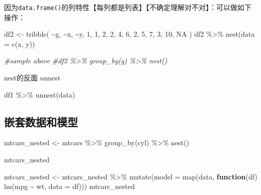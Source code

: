 \documentclass[
]{book}
\newenvironment{Shaded}{\begin{snugshade}}{\end{snugshade}}
\newcommand{\AttributeTok}[1]{\textcolor[rgb]{0.77,0.63,0.00}{#1}}
\newcommand{\CommentTok}[1]{\textcolor[rgb]{0.56,0.35,0.01}{\textit{#1}}}
\newcommand{\ConstantTok}[1]{\textcolor[rgb]{0.00,0.00,0.00}{#1}}
\newcommand{\ControlFlowTok}[1]{\textcolor[rgb]{0.13,0.29,0.53}{\textbf{#1}}}
\newcommand{\DecValTok}[1]{\textcolor[rgb]{0.00,0.00,0.81}{#1}}
\newcommand{\FunctionTok}[1]{\textcolor[rgb]{0.00,0.00,0.00}{#1}}
\newcommand{\NormalTok}[1]{#1}
\newcommand{\OtherTok}[1]{\textcolor[rgb]{0.56,0.35,0.01}{#1}}
\newcommand{\SpecialCharTok}[1]{\textcolor[rgb]{0.00,0.00,0.00}{#1}}
\begin{document}
因为\texttt{data.frame()}的列特性【每列都是列表】【不确定理解对不对】：可以做如下操作：

\begin{Shaded}
\begin{Highlighting}[]
\NormalTok{df2 }\OtherTok{\textless{}{-}} \FunctionTok{tribble}\NormalTok{(}
  \SpecialCharTok{\textasciitilde{}}\NormalTok{g, }\SpecialCharTok{\textasciitilde{}}\NormalTok{x, }\SpecialCharTok{\textasciitilde{}}\NormalTok{y,}
   \DecValTok{1}\NormalTok{,  }\DecValTok{1}\NormalTok{,  }\DecValTok{2}\NormalTok{,}
   \DecValTok{2}\NormalTok{,  }\DecValTok{4}\NormalTok{,  }\DecValTok{6}\NormalTok{,}
   \DecValTok{2}\NormalTok{,  }\DecValTok{5}\NormalTok{,  }\DecValTok{7}\NormalTok{,}
   \DecValTok{3}\NormalTok{, }\DecValTok{10}\NormalTok{,  }\ConstantTok{NA}
\NormalTok{)}
\NormalTok{df2 }\SpecialCharTok{\%\textgreater{}\%} \FunctionTok{nest}\NormalTok{(}\AttributeTok{data =} \FunctionTok{c}\NormalTok{(x, y))}

\CommentTok{\#sample above}
\CommentTok{\#df2 \%\textgreater{}\% group\_by(g) \%\textgreater{}\% nest()}
\end{Highlighting}
\end{Shaded}

nest的反面 unnest

\begin{Shaded}
\begin{Highlighting}[]
\NormalTok{df1 }\SpecialCharTok{\%\textgreater{}\%} \FunctionTok{unnest}\NormalTok{(data)}
\end{Highlighting}
\end{Shaded}

\hypertarget{ux5d4cux5957ux6570ux636eux548cux6a21ux578b}{%
\subsection{嵌套数据和模型}\label{ux5d4cux5957ux6570ux636eux548cux6a21ux578b}}

\begin{Shaded}
\begin{Highlighting}[]
\NormalTok{mtcars\_nested }\OtherTok{\textless{}{-}}\NormalTok{ mtcars }\SpecialCharTok{\%\textgreater{}\%} 
  \FunctionTok{group\_by}\NormalTok{(cyl) }\SpecialCharTok{\%\textgreater{}\%} 
  \FunctionTok{nest}\NormalTok{()}

\NormalTok{mtcars\_nested}
\end{Highlighting}
\end{Shaded}

\begin{Shaded}
\begin{Highlighting}[]
\NormalTok{mtcars\_nested }\OtherTok{\textless{}{-}}\NormalTok{ mtcars\_nested }\SpecialCharTok{\%\textgreater{}\%} 
  \FunctionTok{mutate}\NormalTok{(}\AttributeTok{model =} \FunctionTok{map}\NormalTok{(data, }\ControlFlowTok{function}\NormalTok{(df) }\FunctionTok{lm}\NormalTok{(mpg }\SpecialCharTok{\textasciitilde{}}\NormalTok{ wt, }\AttributeTok{data =}\NormalTok{ df)))}
\NormalTok{mtcars\_nested}
\end{Highlighting}
\end{Shaded}
\end{document}

